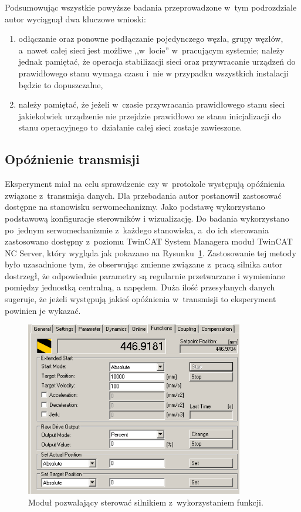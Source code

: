 Podsumowując wszystkie powyższe badania przeprowadzone w~tym podrozdziale autor wyciągnął dwa kluczowe wnioski:
\begin{enumerate}
\item odłączanie oraz ponowne podłączanie pojedynczego węzła, grupy węzłów, a~nawet całej sieci jest możliwe ,,w~locie'' w~pracującym systemie; należy jednak pamiętać, że operacja stabilizacji sieci oraz przywracanie urządzeń do prawidłowego stanu wymaga czasu i~nie w przypadku wszystkich instalacji będzie to dopuszczalne,
\item należy pamiętać, że jeżeli w~czasie przywracania prawidłowego stanu sieci jakiekolwiek urządzenie nie przejdzie prawidłowo ze stanu inicjalizacji do stanu operacyjnego to~działanie całej sieci zostaje zawieszone.
\end{enumerate}
\subsection{Opóźnienie transmisji}
Eksperyment miał na celu sprawdzenie czy w~protokole występują opóźnienia związane z~transmisja danych. Dla przebadania autor postanowił zastosować dostępne na stanowisku serwomechanizmy. Jako podstawę wykorzystano podstawową konfiguracje sterowników i wizualizację. Do badania wykorzystano po~jednym serwomechanizmie z~każdego stanowiska, a~do ich sterowania zastosowano dostępny z~poziomu TwinCAT System Managera moduł TwinCAT NC Server, który wygląda jak pokazano na Rysunku~\ref{axis_function}. Zastosowanie tej metody było uzasadnione tym, że obserwując zmienne związane z~pracą silnika autor dostrzegł, że odpowiednie parametry są regularnie przetwarzane i wymieniane pomiędzy jednostką centralną, a napędem. Duża ilość przesyłanych danych sugeruje, że jeżeli występują jakieś opóźnienia w~transmisji to eksperyment powinien je wykazać.

\begin{figure}[!htb] 	\centering 	\includegraphics[width=0.85\textwidth]{images/axis_function} \caption{Moduł pozwalający sterować silnikiem z~wykorzystaniem funkcji.} \label{axis_function} \end{figure}

